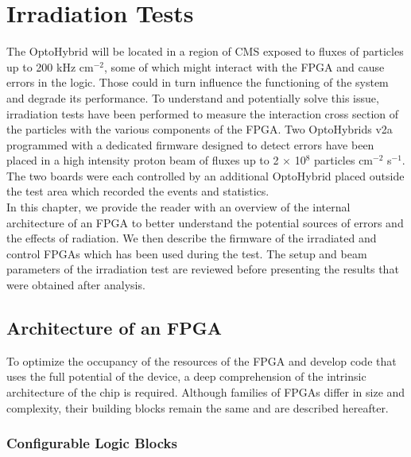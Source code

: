 \chapter{Irradiation Tests}
\label{chap:II-5-irradiation}

  The OptoHybrid will be located in a region of CMS exposed to fluxes of particles up to 200 kHz cm$^{-2}$, some of which might interact with the FPGA and cause errors in the logic. Those could in turn influence the functioning of the system and degrade its performance. To understand and potentially solve this issue, irradiation tests have been performed to measure the interaction cross section of the particles with the various components of the FPGA. Two OptoHybrids v2a programmed with a dedicated firmware designed to detect errors have been placed in a high intensity proton beam of fluxes up to 2 $ \times $ 10$^8$ particles cm$^{-2}$ s$^{-1}$. The two boards were each controlled by an additional OptoHybrid placed outside the test area which recorded the events and statistics. \\

  In this chapter, we provide the reader with an overview of the internal architecture of an FPGA to better understand the potential sources of errors and the effects of radiation. We then describe the firmware of the irradiated and control FPGAs which has been used during the test. The setup and beam parameters of the irradiation test are reviewed before presenting the results that were obtained after analysis.

  \section{Architecture of an FPGA}

    To optimize the occupancy of the resources of the FPGA and develop code that uses the full potential of the device, a deep comprehension of the intrinsic architecture of the chip is required. Although families of FPGAs differ in size and complexity, their building blocks remain the same and are described hereafter.

    \subsection{Configurable Logic Blocks}

